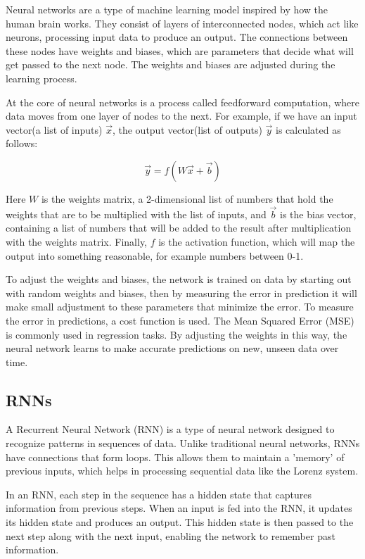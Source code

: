 \documentclass[11pt]{article}
\begin{document}
Neural networks are a type of machine learning model inspired by how the human brain works. They consist of layers of interconnected nodes, which act like neurons, processing input data to produce an output. The connections between these nodes have weights and biases, which are parameters that decide what will get passed to the next node. The weights and biases are adjusted during the learning process.

At the core of neural networks is a process called feedforward computation, where data moves from one layer of nodes to the next. For example, if we have an input vector(a list of inputs) \(\vec{x}\), the output vector(list of outputs) \(\vec{y}\) is calculated as follows:

\[ \vec{y} = f(W\vec{x} + \vec{b}) \]

Here $W$ is the weights matrix, a 2-dimensional list of numbers that hold the weights that are to be multiplied with the list of inputs, and $\vec{b}$ is the bias vector, containing a list of numbers that will be added to the result after multiplication with the weights matrix. Finally, $f$ is the activation function, which will map the output into something reasonable, for example numbers between 0-1.

To adjust the weights and biases, the network is trained on data by starting out with random weights and biases, then by measuring the error in prediction it will make small adjustment to these parameters that minimize the error. To measure the error in predictions, a cost function is used. The Mean Squared Error (MSE) is commonly used in regression tasks. By adjusting the weights in this way, the neural network learns to make accurate predictions on new, unseen data over time.


\subsection{RNNs}

A Recurrent Neural Network (RNN) is a type of neural network designed to recognize patterns in sequences of data. Unlike traditional neural networks, RNNs have connections that form loops. This allows them to maintain a 'memory' of previous inputs, which helps in processing sequential data like the Lorenz system.

In an RNN, each step in the sequence has a hidden state that captures information from previous steps. When an input is fed into the RNN, it updates its hidden state and produces an output. This hidden state is then passed to the next step along with the next input, enabling the network to remember past information.
\end{document}
